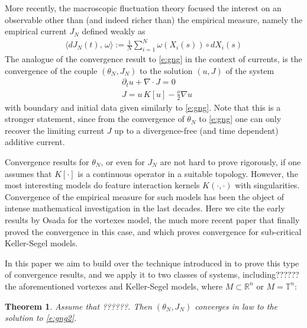 \documentclass[reqno]{amsart}
\newtheorem{theorem}{Theorem}[section]
\numberwithin{equation}{section}
\numberwithin{theorem}{section}
\newcommand{\bb}[1]{{\mathbb #1}}
\newcommand{\bel}[2]{\begin{equation} \label{#1} \begin{split} #2
 \end{split} \end{equation}}
\newcommand{\dangle}[2]{\langle #1,\,#2 \rangle}
\newcommand{\visc}{\nu}
\begin{document}
More recently, the macroscopic fluctuation theory  focused the interest on an observable other than (and indeed richer than) the empirical measure, namely the empirical current $J_N$ defined weakly as
\bel{e:curr1}{
\dangle{dJ_N(t)}{\omega}:=\frac 1N \sum_{i=1}^N\omega(X_i(s))\circ dX_{i}(s)
}
The analogue of the convergence result to \eqref{e:gng} in the context of currents, is the convergence of the couple $(\theta_N,J_N)$ to the solution $(u,J)$ of the system
\bel{e:gng2}{
& \partial_t u+\nabla \cdot J=0
\\
& J=u\,K[u] - \frac{\visc}2 \nabla u
}
with boundary and initial data given similarly to \eqref{e:gng}. Note that this is a stronger statement, since from the convergence of $\theta_N$ to \eqref{e:gng} one can only recover the limiting current $J$ up to a divergence-free (and time dependent) additive current.

Convergence results for $\theta_N$, or even for $J_N$ are not hard to prove rigorously, if one assumes that $K[\cdot]$ is a continuous operator in a suitable topology. However, the most interesting models do feature interaction kernels $K(\cdot,\cdot)$ with singularities. Convergence of the empirical measure for such models has been the object of intense mathematical investigation in the last decades. Here we cite the early results by Osada \cite{Os86} for the vortexes model, the much more recent paper \cite{FHM} that finally proved the convergence in this case, and \cite{GQ} which proves convergence for sub-critical Keller-Segel models.

In this paper we aim to build over the technique introduced in \cite{Fa14} to prove this type of convergence results, and we apply it to two classes of systems, including?????? the aforementioned vortexes and Keller-Segel models, where $M\subset \bb R^{n}$ or $M=\bb T^{n}$:

\begin{theorem}
\label{t:conv1}
Assume that ??????. Then $(\theta_N,J_N)$ converges in law to the solution to \eqref{e:gng2}.
\end{theorem}
\end{document}
